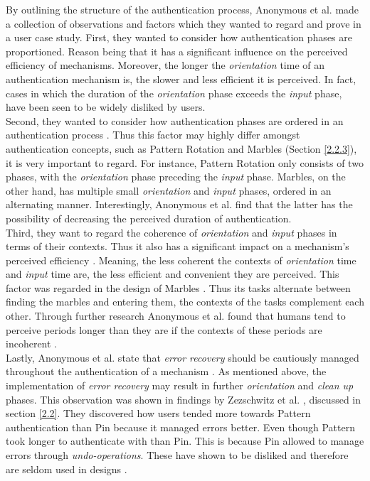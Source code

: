 By outlining the structure of the authentication process, Anonymous et al. \cite{anonymous} made a collection of observations and factors which they wanted to regard and prove in a user case study. First, they wanted to consider how authentication phases are proportioned. Reason being that it has a significant influence on the perceived efficiency of mechanisms. Moreover, the longer the \textit{orientation} time of an authentication mechanism is, the slower and less efficient it is perceived. In fact, cases in which the duration of the \textit{orientation} phase exceeds the \textit{input} phase, have been seen to be widely disliked by users. \\

Second, they wanted to consider how authentication phases are ordered in an authentication process \cite{anonymous}. Thus this factor may highly differ amongst authentication concepts, such as Pattern Rotation and Marbles \cite{Marbles} (Section \ref{2.2.3}), it is very important to regard. For instance, Pattern Rotation only consists of two phases, with the \textit{orientation} phase preceding the \textit{input} phase. Marbles, on the other hand, has multiple small \textit{orientation} and \textit{input} phases, ordered in an alternating manner. Interestingly, Anonymous et al. \cite{anonymous} find that the latter has the possibility of decreasing the perceived duration of authentication. \\

Third, they want to regard the coherence of \textit{orientation} and \textit{input} phases in terms of their contexts. Thus it also has a significant impact on a mechanism's perceived efficiency \cite{anonymous}. Meaning, the less coherent the contexts of \textit{orientation} time and \textit{input} time are, the less efficient and convenient they are perceived. This factor was regarded in the design of Marbles \cite{Marbles}. Thus its tasks alternate between finding the marbles and entering them, the contexts of the tasks complement each other. Through further research Anonymous et al. \cite{anonymous} found that humans tend to perceive periods longer than they are if the contexts of these periods are incoherent \cite{anonymous,perception}.\\

Lastly, Anonymous et al. \cite{anonymous} state that \textit{error recovery} should be cautiously managed throughout the authentication of a mechanism \cite{anonymous}. As mentioned above, the implementation of \textit{error recovery} may result in further \textit{orientation} and \textit{clean up} phases. This observation was shown in findings by Zezschwitz et al. \cite{PatternWild}, discussed in section \ref{2.2}. They discovered how users tended more towards Pattern authentication than Pin because it managed errors better. Even though Pattern took longer to authenticate with than Pin. This is because Pin allowed to manage errors through \textit{undo-operations}. These have shown to be disliked and therefore are seldom used in designs \cite{PatternWild, anonymous}. 

